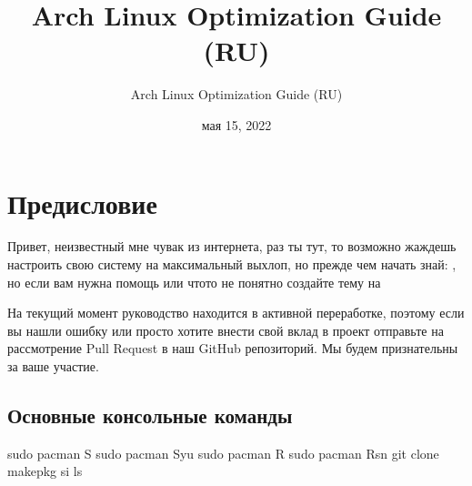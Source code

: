 \documentclass[letterpaper,10pt,russian,openany]{sphinxmanual}
\title{Arch Linux Optimization Guide (RU)}
\date{мая 15, 2022}
\author{Arch Linux Optimization Guide (RU)}
\begin{document}
\pagestyle{empty}
\sphinxmaketitle
\pagestyle{plain}
\sphinxtableofcontents
\pagestyle{normal}
\label{\detokenize{index::doc}}


\sphinxstepscope


\chapter{Предисловие}
\label{\detokenize{source/preface:preface}}\label{\detokenize{source/preface:id1}}\label{\detokenize{source/preface::doc}}
\sphinxAtStartPar
Привет, неизвестный мне чувак из интернета, раз ты тут,
то возможно жаждешь настроить свою систему на максимальный выхлоп, но прежде чем начать \sphinxhyphen{} знай:
,
но если вам нужна помощь или что\sphinxhyphen{}то не понятно  \sphinxhyphen{} создайте тему на 

\sphinxAtStartPar
На текущий момент руководство находится в активной переработке,
поэтому если вы нашли ошибку или просто хотите внести свой вклад в проект \sphinxhyphen{} отправьте на рассмотрение Pull Request в наш GitHub репозиторий.
Мы будем признательны за ваше участие.

\ignorespaces 

\section{Основные консольные команды}
\label{\detokenize{source/preface:basic-commands}}\label{\detokenize{source/preface:index-0}}\label{\detokenize{source/preface:id2}}
\begin{sphinxVerbatim}[commandchars=\\\{\}]
sudo pacman \PYGZhy{}S    
sudo pacman \PYGZhy{}Syu  
sudo pacman \PYGZhy{}R    
sudo pacman \PYGZhy{}Rsn  
git clone         
makepkg \PYGZhy{}si       
                
ls                
\end{sphinxVerbatim}
\end{document}
